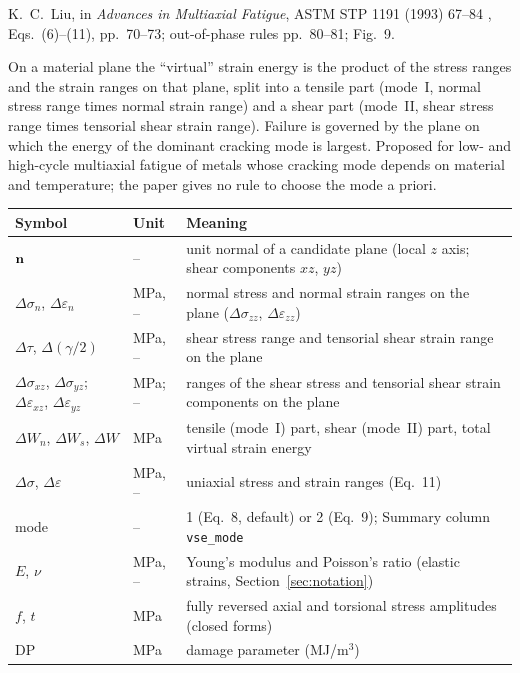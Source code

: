 \label{sheet:VSE}

 K.~C.~Liu, in \emph{Advances in Multiaxial Fatigue}, ASTM STP 1191 (1993) 67--84
\cite{liu1993}, Eqs.~(6)--(11), pp.~70--73; out-of-phase rules pp.~80--81; Fig.~9.

 On a material plane the ``virtual'' strain energy is the product of the
stress ranges and the strain ranges on that plane, split into a tensile part (mode~I, normal stress
range times normal strain range) and a shear part (mode~II, shear stress range times tensorial
shear strain range). Failure is governed by the plane on which the energy of the dominant cracking
mode is largest. Proposed for low- and high-cycle multiaxial fatigue of metals whose cracking mode
depends on material and temperature; the paper gives no rule to choose the mode a priori.

\begin{center}\small
\begin{tabular}{@{}llp{100mm}@{}}
\toprule
Symbol & Unit & Meaning\\\midrule
$\mathbf n$ & -- & unit normal of a candidate plane (local $z$ axis; shear components $xz$, $yz$)\\
$\Delta\sigma_n$, $\Delta\varepsilon_n$ & MPa, -- & normal stress and normal strain ranges on the plane ($\Delta\sigma_{zz}$, $\Delta\varepsilon_{zz}$)\\
$\Delta\tau$, $\Delta(\gamma/2)$ & MPa, -- & shear stress range and tensorial shear strain range on the plane\\
$\Delta\sigma_{xz}$, $\Delta\sigma_{yz}$; $\Delta\varepsilon_{xz}$, $\Delta\varepsilon_{yz}$ & MPa; -- & ranges of the shear stress and tensorial shear strain components on the plane\\
$\Delta W_n$, $\Delta W_s$, $\Delta W$ & MPa & tensile (mode~I) part, shear (mode~II) part, total virtual strain energy\\
$\Delta\sigma$, $\Delta\varepsilon$ & MPa, -- & uniaxial stress and strain ranges (Eq.~11)\\
mode & -- & 1 (Eq.~8, default) or 2 (Eq.~9); Summary column \texttt{vse\_mode}\\
$E$, $\nu$ & MPa, -- & Young's modulus and Poisson's ratio (elastic strains, Section~\ref{sec:notation})\\
$f$, $t$ & MPa & fully reversed axial and torsional stress amplitudes (closed forms)\\
$\mathrm{DP}$ & MPa & damage parameter (MJ/m$^3$)\\
\bottomrule
\end{tabular}
\end{center}

